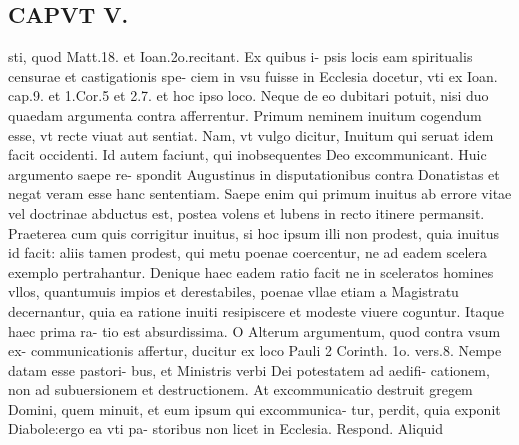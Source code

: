 \documentclass{article}
\begin{document}
\begin{pages}
\section*{CAPVT  V. }
\marginpar{[ p.389 ]}\pstart sti, quod Matt.18. et Ioan.2o.recitant. Ex quibus i- psis locis eam spiritualis censurae et castigationis spe- ciem in vsu fuisse in Ecclesia docetur, vti ex Ioan. cap.9. et 1.Cor.5 et 2.7. et hoc ipso loco. Neque de eo dubitari potuit, nisi duo quaedam argumenta contra afferrentur. Primum neminem inuitum cogendum esse, vt recte viuat aut sentiat. Nam, vt vulgo dicitur, Inuitum qui seruat idem facit occidenti. Id autem faciunt, qui inobsequentes Deo excommunicant. Huic argumento saepe re- spondit Augustinus in disputationibus contra Donatistas et negat veram esse hanc sententiam. Saepe enim qui primum inuitus ab errore vitae vel doctrinae abductus est, postea volens et lubens in recto itinere permansit. Praeterea cum quis corrigitur inuitus, si hoc ipsum illi non prodest, quia inuitus id facit: aliis tamen prodest, qui metu poenae coercentur, ne ad eadem scelera exemplo pertrahantur. Denique haec eadem ratio facit ne in sceleratos homines vllos, quantumuis impios et derestabiles, poenae vllae etiam a Magistratu decernantur, quia ea ratione inuiti resipiscere et modeste viuere coguntur. Itaque haec prima ra- tio est absurdissima. O Alterum argumentum, quod contra vsum ex- communicationis affertur, ducitur ex loco Pauli 2 Corinth. 1o. vers.8. Nempe datam esse pastori- bus, et Ministris verbi Dei potestatem ad aedifi- cationem, non ad subuersionem et destructionem. At excommunicatio destruit gregem Domini, quem minuit, et eum ipsum qui excommunica- tur, perdit, quia exponit Diabole:ergo ea vti pa- storibus non licet in Ecclesia. Respond. Aliquid  \pend

\end{pages}
\end{document}
